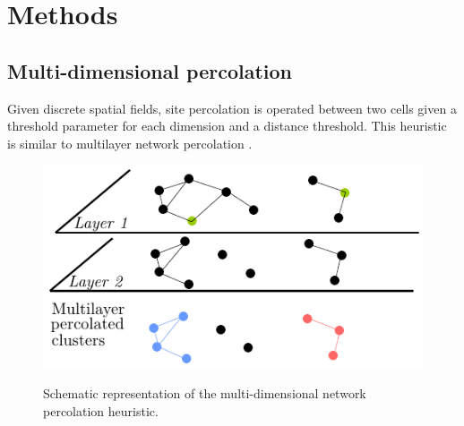\documentclass{jimis-en}
\begin{document}
\section{Methods}



\subsection{Multi-dimensional percolation}


Given discrete spatial fields, site percolation is operated between two cells given a threshold parameter for each dimension and a distance threshold. This heuristic is similar to multilayer network percolation \cite{boccaletti2014structure}.



\begin{figure}[ht] 
  {\includegraphics[width=\linewidth]{figures/principle.pdf}}
  \centering
  \label{fig:method}
  \caption{Schematic representation of the multi-dimensional network percolation heuristic.}
\end{figure}


\end{document}
